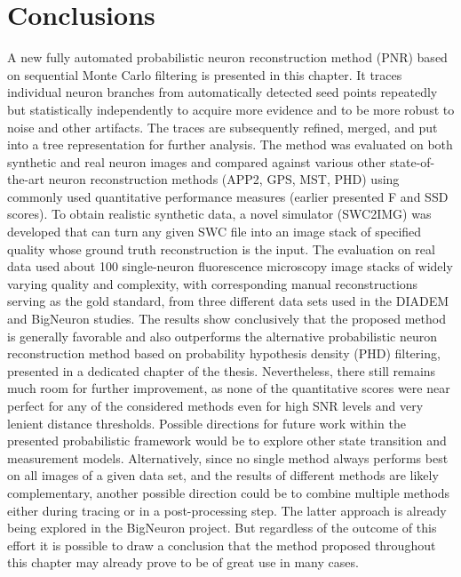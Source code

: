 \section{Conclusions} 
\label{sec:conclusions}
A new fully automated probabilistic neuron reconstruction method (PNR) based on sequential Monte Carlo filtering is presented in this chapter. It traces individual neuron branches from automatically detected seed points repeatedly but statistically independently to acquire more evidence and to be more robust to noise and other artifacts. The traces are subsequently refined, merged, and put into a tree representation for further analysis. The method was evaluated on both synthetic and real neuron images and compared against various other state-of-the-art neuron reconstruction methods (APP2, GPS, MST, PHD) using commonly used quantitative performance measures (earlier presented F and SSD scores). To obtain realistic synthetic data, a novel simulator (SWC2IMG) was developed that can turn any given SWC file into an image stack of specified quality whose ground truth reconstruction is the input. The evaluation on real data used about 100 single-neuron fluorescence microscopy image stacks of widely varying quality and complexity, with corresponding manual reconstructions serving as the gold standard, from three different data sets used in the DIADEM and BigNeuron studies. The results show conclusively that the proposed method is generally favorable and also outperforms the alternative probabilistic neuron reconstruction method based on probability hypothesis density (PHD) filtering, presented in a dedicated chapter of the thesis. Nevertheless, there still remains much room for further improvement, as none of the quantitative scores were near perfect for any of the considered methods even for high SNR levels and very lenient distance thresholds. Possible directions for future work within the presented probabilistic framework would be to explore other state transition and measurement models. Alternatively, since no single method always performs best on all images of a given data set, and the results of different methods are likely complementary, another possible direction could be to combine multiple methods either during tracing or in a post-processing step. The latter approach is already being explored in the BigNeuron project. But regardless of the outcome of this effort it is possible to draw a conclusion that the method proposed throughout this chapter may already prove to be of great use in many cases.